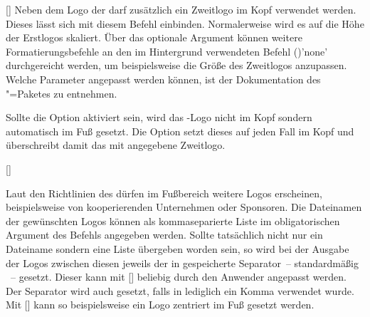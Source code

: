 \begin{Declaration*}{}
\begin{Declaration*}{}
\begin{Declaration*}{}
\begin{Declaration}{[\LParameter{}]}
\printdeclarationlist%
%
%
%
%
Neben dem Logo der \TnUD darf zusätzlich ein Zweitlogo im Kopf verwendet 
werden. Dieses lässt sich mit diesem Befehl einbinden. Normalerweise wird es 
auf die Höhe der Erstlogos skaliert. Über das optionale Argument können weitere 
Formatierungsbefehle an den im Hintergrund verwendeten Befehl 
()'none' durchgereicht werden, um 
beispielsweise die Größe des Zweitlogos anzupassen. Welche Parameter angepasst 
werden können, ist der Dokumentation des "=Paketes zu 
entnehmen.

Sollte die Option  aktiviert sein, wird das \DDC-Logo nicht im Kopf 
sondern automatisch im Fuß gesetzt. Die Option  setzt dieses 
auf jeden Fall im Kopf und überschreibt damit das mit  
angegebene Zweitlogo.
\end{Declaration}

\begin{Declaration}[v2.03]{%
  [\LParameter{}]%
}
\begin{Declaration}[v2.03]{}%
\printdeclarationlist%
%
%
%

Laut den Richtlinien des \CDs dürfen im Fußbereich weitere Logos erscheinen, 
beispielsweise von kooperierenden Unternehmen oder Sponsoren. Die Dateinamen 
der gewünschten Logos können als kommaseparierte Liste im obligatorischen 
Argument des Befehls  angegeben werden. Sollte tatsächlich 
nicht nur ein Dateiname sondern eine Liste übergeben worden sein, so wird bei 
der Ausgabe der Logos zwischen diesen jeweils der in  
gespeicherte Separator~-- standardmäßig ~-- gesetzt. Dieser kann 
mit [\PParameter{\dots}] 
beliebig durch den Anwender angepasst werden. Der Separator wird auch gesetzt, 
falls in  lediglich ein Komma verwendet wurde. Mit 
[] kann so beispielsweise ein 
Logo zentriert im Fuß gesetzt werden.


\end{Declaration}
\end{Declaration}
\end{Declaration*}
\end{Declaration*}
\end{Declaration*}
